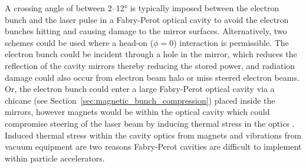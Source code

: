\documentclass[../main.tex]{subfiles}
\begin{document}
A crossing angle of between 2--12\si{\degree} is typically imposed between the electron bunch and the laser pulse in a Fabry-Perot optical cavity \cite{variola2011luminosity} to avoid the electron bunches hitting and causing damage to the mirror surfaces. Alternatively, two schemes could be used where a head-on ($\phi=0$) interaction is permissible. The electron bunch could be incident through a hole in the mirror, which reduces the reflection of the cavity mirrors thereby reducing the stored power, and radiation damage could also occur from electron beam halo or miss steered electron beams. Or, the electron bunch could enter a large Fabry-Perot optical cavity via a chicane (see Section~\ref{sec:magnetic_bunch_compression}) placed inside the mirrors, however magnets would be within the optical cavity which could compromise steering of the laser beam by inducing thermal stress in the optics \cite{gunther2019device}. Induced thermal stress within the cavity optics from magnets and vibrations from vacuum equipment are two reasons Fabry-Perot cavities are difficult to implement within particle accelerators. 
\end{document}
